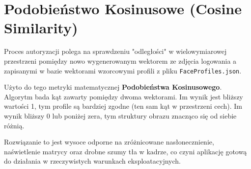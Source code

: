 \section{Podobieństwo Kosinusowe (Cosine Similarity)}
Proces autoryzacji polega na sprawdzeniu "odległości" w wielowymiarowej przestrzeni pomiędzy nowo wygenerowanym wektorem ze zdjęcia logowania a zapisanymi w bazie wektorami wzorcowymi profili z pliku \texttt{FaceProfiles.json}.

Użyto do tego metryki matematycznej \textbf{Podobieństwa Kosinusowego}. 
Algorytm bada kąt zawarty pomiędzy dwoma wektorami. Im wynik jest bliższy wartości 1, tym profile są bardziej zgodne (ten sam kąt w przestrzeni cech). Im wynik bliższy 0 lub poniżej zera, tym struktury obrazu znacząco się od siebie różnią.

Rozwiązanie to jest wysoce odporne na zróżnicowane nasłonecznienie, naświetlenie matrycy oraz drobne szumy tła w kadrze, co czyni aplikację gotową do działania w rzeczywistych warunkach eksploatacyjnych.
